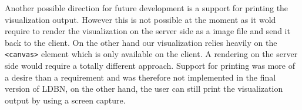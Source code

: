 Another possible direction for future development is a support for printing the visualization output.
However this is not possible at the moment as it wold require to render the visualization on the server side as
a image file and send it back to the client. On the other hand our visualization relies heavily on
the \verb=<canvas>= element which is only available on the client. A rendering on the server side would
require a totally different approach. Support for printing was more of a desire than a requirement and
was therefore not implemented in the final version of LDBN, 
on the other hand, the user can still print the visualization output
by using a screen capture.
